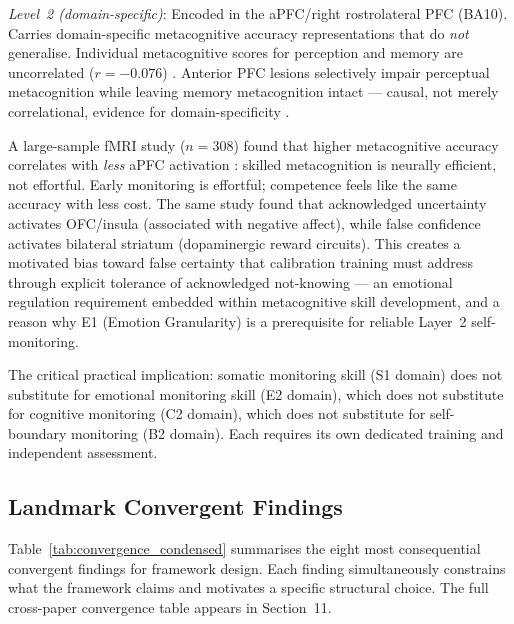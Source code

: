 \documentclass[12pt, a4paper]{article}
\begin{document}
\emph{Level~2 (domain-specific)}: Encoded in the aPFC/right rostrolateral PFC
(BA10). Carries domain-specific metacognitive accuracy representations that do
\emph{not} generalise. Individual metacognitive scores for perception and memory
are uncorrelated ($r = -0.076$) \citep{morales2018}. Anterior PFC lesions selectively
impair perceptual metacognition while leaving memory metacognition intact ---
causal, not merely correlational, evidence for domain-specificity \citep{fleming2014}.

A large-sample fMRI study ($n = 308$) found that higher metacognitive accuracy
correlates with \emph{less} aPFC activation \citep{molenberghs2016}: skilled
metacognition is neurally efficient, not effortful. Early monitoring is effortful;
competence feels like the same accuracy with less cost. The same study found that
acknowledged uncertainty activates OFC/insula (associated with negative affect),
while false confidence activates bilateral striatum (dopaminergic reward circuits).
This creates a motivated bias toward false certainty that calibration training
must address through explicit tolerance of acknowledged not-knowing --- an emotional
regulation requirement embedded within metacognitive skill development, and a reason
why E1 (Emotion Granularity) is a prerequisite for reliable Layer~2 self-monitoring.

The critical practical implication: somatic monitoring skill (S1 domain) does not
substitute for emotional monitoring skill (E2 domain), which does not substitute for
cognitive monitoring (C2 domain), which does not substitute for self-boundary
monitoring (B2 domain). Each requires its own dedicated training and independent
assessment.

\subsection*{Landmark Convergent Findings}

Table~\ref{tab:convergence_condensed} summarises the eight most consequential
convergent findings for framework design. Each finding simultaneously constrains
what the framework claims and motivates a specific structural choice. The full
cross-paper convergence table appears in Section~11.
\end{document}
